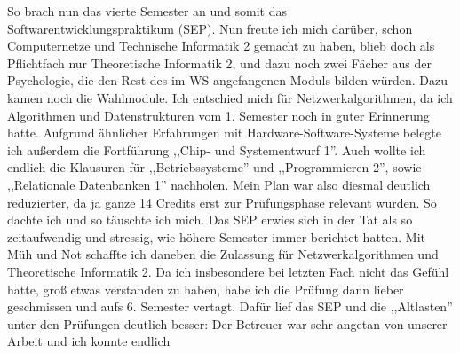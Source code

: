 So brach nun das vierte Semester an und somit das
Softwarentwicklungspraktikum (SEP). Nun freute ich mich darüber, schon
Computernetze und Technische Informatik 2 gemacht zu haben, blieb doch
als Pflichtfach nur Theoretische Informatik 2, und dazu noch zwei
Fächer aus der Psychologie, die den Rest des im WS angefangenen Moduls
bilden würden. Dazu kamen noch die Wahlmodule. Ich entschied
mich für Netzwerkalgorithmen, da ich Algorithmen und Datenstrukturen
vom 1. Semester noch in guter Erinnerung hatte. Aufgrund ähnlicher
Erfahrungen mit Hardware-Software-Systeme belegte ich außerdem die
Fortführung ,,Chip- und Systementwurf 1''.  Auch wollte ich endlich
die Klausuren für ,,Betriebssysteme'' und ,,Programmieren 2'', sowie
,,Relationale Datenbanken 1''
nachholen. 
Mein Plan war also diesmal deutlich reduzierter, da ja ganze 14 Credits
erst zur Prüfungsphase relevant wurden. So dachte ich und so täuschte
ich mich. Das SEP erwies sich in der Tat als so zeitaufwendig und
stressig, wie höhere Semester immer berichtet hatten. Mit Müh und Not
schaffte ich daneben die Zulassung für Netzwerkalgorithmen und
Theoretische Informatik 2. Da ich insbesondere bei letzten Fach nicht
das Gefühl hatte, groß etwas verstanden zu haben, habe ich die Prüfung
dann lieber geschmissen und aufs 6. Semester vertagt. Dafür lief das
SEP und die ,,Altlasten'' unter den Prüfungen deutlich besser: Der
Betreuer war sehr angetan von unserer Arbeit und ich konnte endlich
